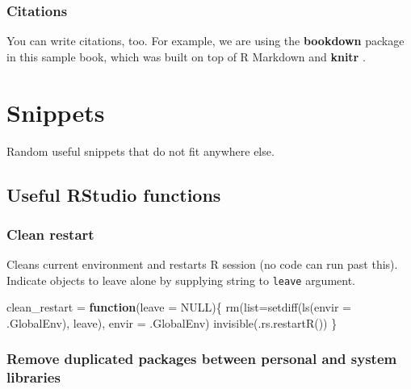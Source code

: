 \documentclass[
]{book}
\newenvironment{Shaded}{\begin{snugshade}}{\end{snugshade}}
\newcommand{\AttributeTok}[1]{\textcolor[rgb]{0.77,0.63,0.00}{#1}}
\newcommand{\ConstantTok}[1]{\textcolor[rgb]{0.00,0.00,0.00}{#1}}
\newcommand{\ControlFlowTok}[1]{\textcolor[rgb]{0.13,0.29,0.53}{\textbf{#1}}}
\newcommand{\FunctionTok}[1]{\textcolor[rgb]{0.00,0.00,0.00}{#1}}
\newcommand{\NormalTok}[1]{#1}
\newcommand{\OtherTok}[1]{\textcolor[rgb]{0.56,0.35,0.01}{#1}}
\begin{document}
\hypertarget{citations}{%
\subsection{Citations}\label{citations}}

You can write citations, too. For example, we are using the \textbf{bookdown} package \citep{R-bookdown} in this sample book, which was built on top of R Markdown and \textbf{knitr} \citep{xie2015}.

\hypertarget{snippets}{%
\chapter{Snippets}\label{snippets}}

Random useful snippets that do not fit anywhere else.

\hypertarget{useful-rstudio-functions}{%
\section{Useful RStudio functions}\label{useful-rstudio-functions}}

\hypertarget{clean-restart}{%
\subsection{Clean restart}\label{clean-restart}}

Cleans current environment and restarts R session (no code can run past this). Indicate objects to leave alone by supplying string to \texttt{leave} argument.

\begin{Shaded}
\begin{Highlighting}[]
\NormalTok{clean\_restart }\OtherTok{=} \ControlFlowTok{function}\NormalTok{(}\AttributeTok{leave =} \ConstantTok{NULL}\NormalTok{)\{}
  \FunctionTok{rm}\NormalTok{(}\AttributeTok{list=}\FunctionTok{setdiff}\NormalTok{(}\FunctionTok{ls}\NormalTok{(}\AttributeTok{envir =}\NormalTok{ .GlobalEnv), leave), }\AttributeTok{envir =}\NormalTok{ .GlobalEnv)}
  \FunctionTok{invisible}\NormalTok{(}\FunctionTok{.rs.restartR}\NormalTok{())}
\NormalTok{\}}
\end{Highlighting}
\end{Shaded}

\hypertarget{remove-duplicated-packages-between-personal-and-system-libraries}{%
\subsection{Remove duplicated packages between personal and system libraries}\label{remove-duplicated-packages-between-personal-and-system-libraries}}
\end{document}
